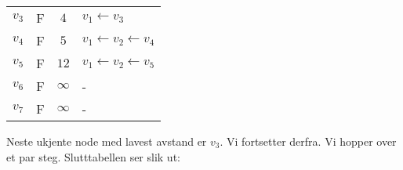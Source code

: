 \begin{example}
\begin{center}
\begin{tabular}{c | c | c | l}
	$ v_3 $ & F     & $ 4 $      & $ v_1 \leftarrow v_3 $                \\
	$ v_4 $ & F     & $ 5 $      & $ v_1 \leftarrow v_2 \leftarrow v_4 $ \\
	$ v_5 $ & F     & $ 12 $     & $ v_1 \leftarrow v_2 \leftarrow v_5 $ \\
	$ v_6 $ & F     & $ \infty $ & -                                     \\
	$ v_7 $ & F     & $ \infty $ & -
\end{tabular}
\end{center}
Neste ukjente node med lavest avstand er $ v_3 $. Vi fortsetter derfra. Vi hopper over et par steg. Slutttabellen ser slik ut:

\end{example}

